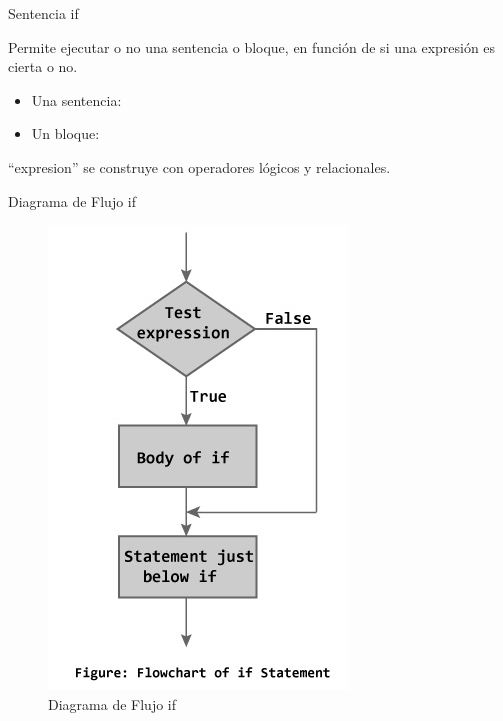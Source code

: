 \begin{frame}[fragile]{Sentencia if}

Permite ejecutar o no una sentencia o bloque, en función de si una
expresión es cierta o no.

\begin{itemize}
\itemsep1pt\parskip0pt
\item
  Una sentencia:
\end{itemize}

\begin{Shaded}
\begin{Highlighting}[]
 
\end{Highlighting}
\end{Shaded}

\begin{itemize}
\itemsep1pt\parskip0pt
\item
  Un bloque:
\end{itemize}

\begin{Shaded}
\begin{Highlighting}[]
 
    \NormalTok{\{}
    \NormalTok{\}}
\end{Highlighting}
\end{Shaded}

``expresion'' se construye con operadores lógicos y relacionales.

\end{frame}

\begin{frame}{Diagrama de Flujo if}

\begin{figure}[htbp]
\centering
\includegraphics{if.jpg}
\caption{Diagrama de Flujo if}
\end{figure}

\end{frame}

